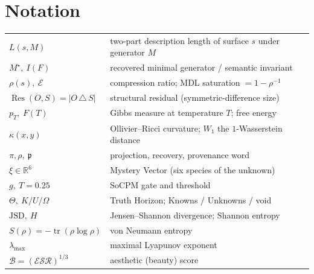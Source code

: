 \documentclass[11pt]{article}
\theoremstyle{definition}
\theoremstyle{plain}
\theoremstyle{remark}
\newcommand{\R}{\mathbb{R}}
\newcommand{\symdiff}{\,\triangle\,}
\newcommand{\tr}{\operatorname{tr}}
\newcommand{\Res}{\operatorname{Res}}
\begin{document}
\section*{Notation}
\begin{tabular}{ll}
$L(s,M)$ & two-part description length of surface $s$ under generator $M$\\
$M^\star,\ I(F)$ & recovered minimal generator / semantic invariant\\
$\rho(s),\ \mathcal E$ & compression ratio; MDL saturation $=1-\rho^{-1}$\\
$\Res(O,S)=|O\symdiff S|$ & structural residual (symmetric-difference size)\\
$p_T,\ F(T)$ & Gibbs measure at temperature $T$; free energy\\
$\kappa(x,y)$ & Ollivier--Ricci curvature; $W_1$ the $1$-Wasserstein distance\\
$\pi,\rho,\ \mathfrak p$ & projection, recovery, provenance word\\
$\xi\in\R^6$ & Mystery Vector (six species of the unknown)\\
$g,\ T{=}0.25$ & SoCPM gate and threshold\\
$\Theta,\ K/U/\Omega$ & Truth Horizon; Knowns / Unknowns / void\\
$\mathrm{JSD},\ H$ & Jensen--Shannon divergence; Shannon entropy\\
$S(\rho)=-\tr(\rho\log\rho)$ & von Neumann entropy\\
$\lambda_{\max}$ & maximal Lyapunov exponent\\
$\mathcal B=(\mathcal E\mathcal S\mathcal R)^{1/3}$ & aesthetic (beauty) score\\
\end{tabular}

\end{document}
